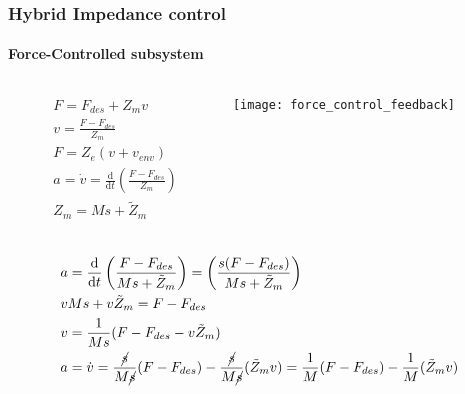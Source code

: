 \begin{frame}[shrink=10]
  \frametitle{Hybrid Impedance control}
  \framesubtitle{Force-Controlled subsystem}
  \begin{columns}
    \begin{column}{0.4\textwidth}
      \begin{align*}
        &F = F_{des} + Z_m v\\
        &v = \frac{F - F_{des}}{Z_m}\\
        &F = Z_e(v + v_{env})\\
        &a = \dot{v} = \frac{\mathrm{d}}{\mathrm{d}t} \left(\frac{F - F_{des}}{Z_m} \right)\\
        &Z_m = M s + \tilde{Z}_m\\
      \end{align*}
    \end{column}
    \begin{column}{0.5\textwidth}
      \centering
      \texttt{[image: force\_control\_feedback]}
    \end{column}
  \end{columns}

  \begin{align*}
    &a = \frac{\mathrm{d}}{\mathrm{d}t} \left(\frac{F - F_{des}}{Ms + \tilde{Z}_m} \right) = \left(\frac{s(F - F_{des})}{Ms + \tilde{Z}_m} \right)\\
    &vMs + v \tilde{Z}_m = F - F_{des}\\
    &v = \frac{1}{Ms} (F - F_{des} - v \tilde{Z}_m )\\
    &a = \dot{v} = \frac{\cancel{s}}{M\cancel{s}} (F - F_{des}) - \frac{\cancel{s}}{M\cancel{s}}( \tilde{Z}_m v) = \frac{1}{M} (F - F_{des}) - \frac{1}{M}( \tilde{Z}_m v) \\
  \end{align*}
\end{frame}

